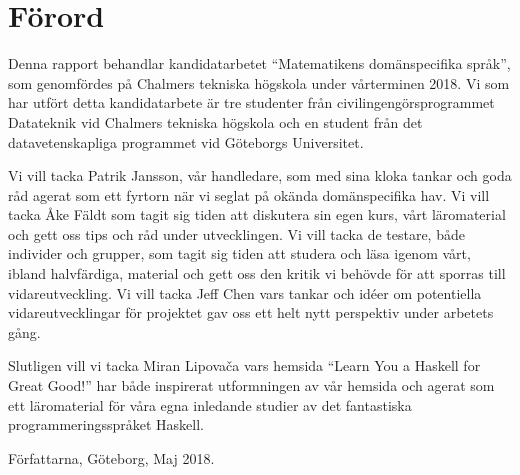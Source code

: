 \thispagestyle{plain}			%
\section*{Förord}

\begin{draft}

Denna rapport behandlar kandidatarbetet ``Matematikens domänspecifika språk'',
som genomfördes på Chalmers tekniska högskola under vårterminen 2018. Vi som har
utfört detta kandidatarbete är tre studenter från civilingengörsprogrammet
Datateknik vid Chalmers tekniska högskola och en student från det
datavetenskapliga programmet vid Göteborgs Universitet.

Vi vill tacka Patrik Jansson, vår handledare, som med sina kloka tankar och goda
råd agerat som ett fyrtorn när vi seglat på okända domänspecifika hav. Vi vill
tacka Åke Fäldt som tagit sig tiden att diskutera sin egen kurs, vårt
läromaterial och gett oss tips och råd under utvecklingen. Vi vill tacka de
testare, både individer och grupper, som tagit sig tiden att studera och läsa
igenom vårt, ibland halvfärdiga, material och gett oss den kritik vi behövde för
att sporras till vidareutveckling. Vi vill tacka Jeff Chen vars tankar och idéer
om potentiella vidareutvecklingar för projektet gav oss ett helt nytt perspektiv
under arbetets gång.

Slutligen vill vi tacka Miran Lipovača vars hemsida ``Learn You a
Haskell for Great Good!'' har både inspirerat utformningen av vår hemsida och
agerat som ett läromaterial för våra egna inledande studier av det fantastiska
programmeringsspråket Haskell. 

\end{draft}

\vspace{1.5cm}
\hfill
Författarna, Göteborg, Maj 2018.

\newpage				%
\thispagestyle{empty}
\mbox{}
